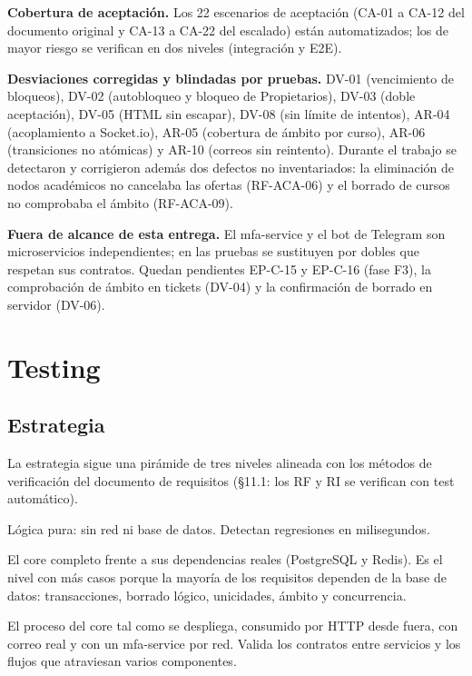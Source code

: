 \documentclass[11pt,a4paper]{report}
\begin{document}
\textbf{Cobertura de aceptación.} Los 22 escenarios de aceptación (CA-01 a CA-12 del documento original y CA-13 a CA-22 del escalado) están automatizados; los de mayor riesgo se verifican en dos niveles (integración y E2E).

\textbf{Desviaciones corregidas y blindadas por pruebas.} DV-01 (vencimiento de bloqueos), DV-02 (autobloqueo y bloqueo de Propietarios), DV-03 (doble aceptación), DV-05 (HTML sin escapar), DV-08 (sin límite de intentos), AR-04 (acoplamiento a Socket.io), AR-05 (cobertura de ámbito por curso), AR-06 (transiciones no atómicas) y AR-10 (correos sin reintento). Durante el trabajo se detectaron y corrigieron además dos defectos no inventariados: la eliminación de nodos académicos no cancelaba las ofertas (RF-ACA-06) y el borrado de cursos no comprobaba el ámbito (RF-ACA-09).

\textbf{Fuera de alcance de esta entrega.} El mfa-service y el bot de Telegram son microservicios independientes; en las pruebas se sustituyen por dobles que respetan sus contratos. Quedan pendientes EP-C-15 y EP-C-16 (fase F3), la comprobación de ámbito en tickets (DV-04) y la confirmación de borrado en servidor (DV-06).

\chapter{Testing}

\section{Estrategia}

La estrategia sigue una pirámide de tres niveles alineada con los métodos de verificación del documento de requisitos (§11.1: los RF y RI se verifican con test automático).

\begin{description}[style=nextline,leftmargin=1.2cm]
\item[Unitarias] Lógica pura: sin red ni base de datos. Detectan regresiones en milisegundos.
\item[Integración] El core completo frente a sus dependencias reales (PostgreSQL y Redis). Es el nivel con más casos porque la mayoría de los requisitos dependen de la base de datos: transacciones, borrado lógico, unicidades, ámbito y concurrencia.
\item[Extremo a extremo] El proceso del core tal como se despliega, consumido por HTTP desde fuera, con correo real y con un mfa-service por red. Valida los contratos entre servicios y los flujos que atraviesan varios componentes.
\end{description}
\end{document}
